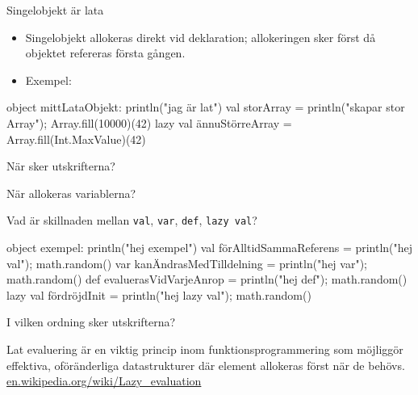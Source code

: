 \begin{Slide}{Singelobjekt är lata}

\begin{itemize}
  \item Singelobjekt allokeras  direkt vid deklaration; allokeringen sker först då objektet refereras första gången.

\pause

  \item Exempel:

\end{itemize}

\begin{Code}[basicstyle=\ttfamily\fontsize{8}{11}\selectfont]
object mittLataObjekt:
  println("jag är lat")
  val storArray = { println("skapar stor Array"); Array.fill(10000)(42) }
  lazy val ännuStörreArray = Array.fill(Int.MaxValue)(42)
\end{Code}

När sker utskrifterna?

När allokeras variablerna?

\end{Slide}




\begin{Slide}{Vad är skillnaden mellan \texttt{val}, \texttt{var}, \texttt{def}, \texttt{lazy val}?}
\begin{Code}[basicstyle=\ttfamily\fontsize{8}{11}\selectfont]
object exempel:
  println("hej exempel")
  val förAlltidSammaReferens  = {println("hej val"); math.random()}
  var kanÄndrasMedTilldelning = {println("hej var"); math.random()}
  def evaluerasVidVarjeAnrop  = {println("hej def"); math.random()}
  lazy val fördröjdInit = {println("hej lazy val"); math.random()}
\end{Code}
I vilken ordning sker utskrifterna?


\pause
{\vspace{2em}\SlideFontTiny Lat evaluering är en viktig princip inom funktionsprogrammering som möjliggör effektiva, oföränderliga datastrukturer där element allokeras först när de behövs. \\
\href{https://en.wikipedia.org/wiki/Lazy_evaluation}{en.wikipedia.org/wiki/Lazy\_evaluation}
}
\end{Slide}


